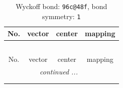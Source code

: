 \documentclass[fleqn,8pt]{jsarticle}
\begin{document}
\renewcommand{\arraystretch}{1.2}
\begin{longtable}{cccc}
\caption{Wyckoff bond: {\tt 96c@48f}, bond symmetry: {\tt 1}}
 \\
 \hline \hline
No. & vector & center & mapping \\ \hline \endfirsthead

\multicolumn{3}{l}{\tablename\ \thetable{}} \\
 \hline \hline
No. & vector & center & mapping \\ \hline \endhead

 \hline \hline
\multicolumn{3}{r}{\footnotesize\it continued ...} \\ \endfoot

 \hline \hline
\multicolumn{3}{r}{} \\ \endlastfoot


\end{longtable}
\end{document}
